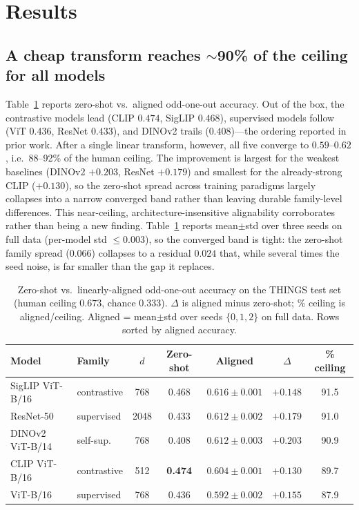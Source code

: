 \documentclass{article}
\begin{document}
\section{Results}

\subsection{A cheap transform reaches \texorpdfstring{$\sim$}{~}90\% of the ceiling for all models}
Table~\ref{tab:main} reports zero-shot vs.\ aligned odd-one-out accuracy. Out of
the box, the contrastive models lead (CLIP $0.474$, SigLIP $0.468$), supervised
models follow (ViT $0.436$, ResNet $0.433$), and DINOv2 trails ($0.408$)---the
ordering reported in prior work. After a single linear transform, however, all
five converge to $0.59$--$0.62$, i.e.\ 88--92\% of the human ceiling. The
improvement is largest for the weakest baselines (DINOv2 $+0.203$, ResNet
$+0.179$) and smallest for the already-strong CLIP ($+0.130$), so the zero-shot
spread across training paradigms largely collapses into a narrow converged band
rather than leaving durable family-level differences. This near-ceiling,
architecture-insensitive alignability corroborates
\citet{muttenthaler2023human,muttenthaler2024aligning} rather than being a new
finding. Table~\ref{tab:main} reports mean$\pm$std over three seeds on full data
(per-model std $\le 0.003$), so the converged band is tight: the zero-shot family
spread ($0.066$) collapses to a residual $0.024$ that, while several times the seed
noise, is far smaller than the gap it replaces.

\begin{table}[t]
\centering
\caption{Zero-shot vs.\ linearly-aligned odd-one-out accuracy on the THINGS test
set (human ceiling $0.673$, chance $0.333$). $\Delta$ is aligned minus zero-shot;
\% ceiling is aligned/ceiling. Aligned = mean$\pm$std over seeds $\{0,1,2\}$ on
full data. Rows sorted by aligned accuracy.}
\label{tab:main}
\begin{tabular}{llccccc}
\toprule
Model & Family & $d$ & Zero-shot & Aligned & $\Delta$ & \% ceiling \\
\midrule
SigLIP ViT-B/16 & contrastive & 768  & 0.468 & $\mathbf{0.616 \pm 0.001}$ & $+0.148$ & 91.5 \\
ResNet-50       & supervised  & 2048 & 0.433 & $0.612 \pm 0.002$ & $+0.179$ & 91.0 \\
DINOv2 ViT-B/14 & self-sup.   & 768  & 0.408 & $0.612 \pm 0.003$ & $\mathbf{+0.203}$ & 90.9 \\
CLIP ViT-B/16   & contrastive & 512  & \textbf{0.474} & $0.604 \pm 0.001$ & $+0.130$ & 89.7 \\
ViT-B/16        & supervised  & 768  & 0.436 & $0.592 \pm 0.002$ & $+0.155$ & 87.9 \\
\bottomrule
\end{tabular}
\end{table}
\end{document}
